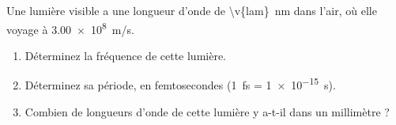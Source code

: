 Une lumière visible a une longueur d'onde de \qty{\v{lam}}{nm} dans l'air, où elle voyage à \qty{3.00e8}{m/s}.

\begin{enumerate}[label=\alph*)]
    \item Déterminez la fréquence de cette lumière.
    \item Déterminez sa période, en femtosecondes (\qty{1}{fs} = \qty{1e-15}{s}).
    \item Combien de longueurs d'onde de cette lumière y a-t-il dans un millimètre ?
\end{enumerate}
